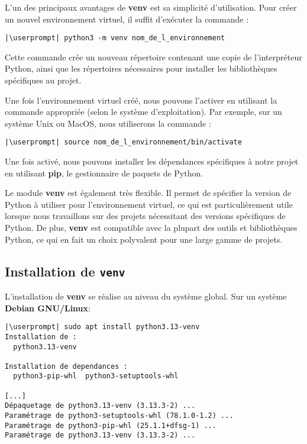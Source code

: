 L'un des principaux avantages de \textbf{venv} est sa simplicité d'utilisation. Pour créer un nouvel environnement virtuel, il suffit d'exécuter la commande :
\begin{lstlisting}[style=bash]
|\userprompt| python3 -m venv nom_de_l_environnement
\end{lstlisting}

Cette commande crée un nouveau répertoire contenant une copie de l'interpréteur Python, ainsi que les répertoires nécessaires pour installer les bibliothèques spécifiques au projet. 

Une fois l'environnement virtuel créé, nous pouvons l'activer en utilisant la commande appropriée (selon le système d'exploitation). Par exemple, sur un système Unix ou MacOS, nous utiliserons la commande :
\begin{lstlisting}[style=bash]
|\userprompt| source nom_de_l_environnement/bin/activate
\end{lstlisting}

Une fois activé, nous pouvons installer les dépendances spécifiques à notre projet en utilisant \textbf{pip}, le gestionnaire de paquets de Python.

Le module \textbf{venv} est également très flexible. Il permet de spécifier la version de Python à utiliser pour l'environnement virtuel, ce qui est particulièrement utile lorsque nous travaillons sur des projets nécessitant des versions spécifiques de Python. De plus, \textbf{venv} est compatible avec la plupart des outils et bibliothèques Python, ce qui en fait un choix polyvalent pour une large gamme de projets.

\subsection*{Installation de \texttt{venv}}
L'installation de \textbf{venv} se réalise au niveau du système global. Sur un système \textbf{Debian GNU/Linux}:

\begin{lstlisting}[style=bash]
|\userprompt| sudo apt install python3.13-venv
Installation de :
  python3.13-venv

Installation de dependances :
  python3-pip-whl  python3-setuptools-whl

[...]
Dépaquetage de python3.13-venv (3.13.3-2) ...
Paramétrage de python3-setuptools-whl (78.1.0-1.2) ...
Paramétrage de python3-pip-whl (25.1.1+dfsg-1) ...
Paramétrage de python3.13-venv (3.13.3-2) ...
\end{lstlisting}

